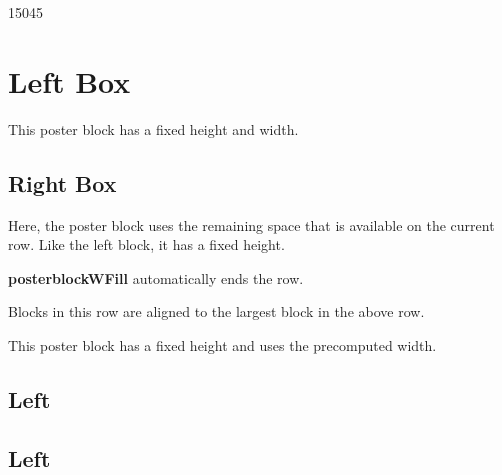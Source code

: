 \documentclass[a4paper, 11pt]{article}
\let \oldsection \section
\renewcommand{\section}{\vspace{-10pt}\oldsection}
\begin{document}
\begin{poster}
\begin{postercolumns}[2]
    \end{postercolumns}

    \begin{posterrows}[3]

        \begin{posterblockW}{150}{45}
            \section{Left Box}
            This poster block has a fixed height and width.
        \end{posterblockW}

        \begin{posterblockWFill}{35}
            \section{Right Box}
            Here, the poster block uses the remaining space that is available on the current row.
            Like the left block, it has a fixed height.
        \end{posterblockWFill}

        \begin{posterblock}
            {\bf posterblockWFill} automatically ends the row.
        \end{posterblock}

        \begin{posterblock}
            Blocks in this row are aligned to the largest block in the above row.
        \end{posterblock}

        \begin{posterblockH}{30}
            This poster block has a fixed height and uses the precomputed width.
        \end{posterblockH}

    \end{posterrows}

    \begin{postercolumns}[5]
        \begin{posterblock}
            \section{Left}
        \end{posterblock}
        \begin{posterblock}
            \section{Left}
        \end{posterblock}
        \begin{posterblock}

\end{posterblock}
\end{postercolumns}
\end{poster}
\end{document}
